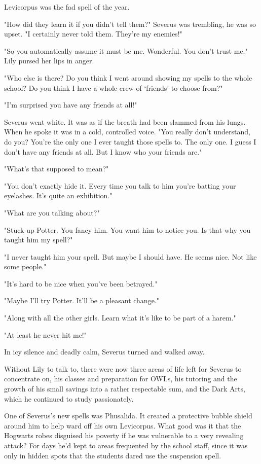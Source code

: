 \documentclass[a4paper,11pt]{article}
\begin{document}
Levicorpus was the fad spell of the year.

"How did they learn it if you didn't tell them?" Severus was trembling, he was so upset. "I certainly never told them. They're my enemies!"

"So you automatically assume it must be me. Wonderful. You don't trust me." Lily pursed her lips in anger.

"Who else is there? Do you think I went around showing my spells to the whole school? Do you think I have a whole crew of `friends' to choose from?"

"I'm surprised you have any friends at all!"

Severus went white. It was as if the breath had been slammed from his lungs. When he spoke it was in a cold, controlled voice. "You really don't understand, do you? You're the only one I ever taught those spells to. The only one. I guess I don't have any friends at all. But I know who your friends are."

"What's that supposed to mean?"

"You don't exactly hide it. Every time you talk to him you're batting your eyelashes. It's quite an exhibition."

"What are you talking about?"

"Stuck-up Potter. You fancy him. You want him to notice you. Is that why you taught him my spell?"

"I never taught him your spell. But maybe I should have. He seems nice. Not like some people."

"It's hard to be nice when you've been betrayed."

"Maybe I'll try Potter. It'll be a pleasant change."

"Along with all the other girls. Learn what it's like to be part of a harem."

"At least he never hit me!"

In icy silence and deadly calm, Severus turned and walked away.

Without Lily to talk to, there were now three areas of life left for Severus to concentrate on, his classes and preparation for OWLs, his tutoring and the growth of his small savings into a rather respectable sum, and the Dark Arts, which he continued to study passionately.

One of Severus's new spells was Phusalida. It created a protective bubble shield around him to help ward off his own Levicorpus. What good was it that the Hogwarts robes disguised his poverty if he was vulnerable to a very revealing attack? For days he'd kept to areas frequented by the school staff, since it was only in hidden spots that the students dared use the suspension spell.
\end{document}

